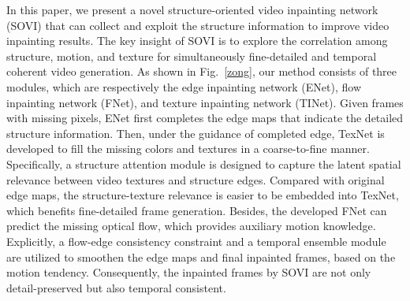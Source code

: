 In this paper, we present a novel structure-oriented video inpainting network (SOVI) that can collect and exploit the structure information to improve video inpainting results. %
The key insight of SOVI is to explore the correlation among structure, motion, and texture for simultaneously fine-detailed and temporal coherent video generation. %
As shown in Fig.~\ref{zong}, our method consists of three modules, which are respectively the edge inpainting network (ENet), flow inpainting network (FNet), and texture inpainting network (TINet).
Given frames with missing pixels, ENet first completes the edge maps that indicate the detailed structure information. Then, under the guidance of completed edge, TexNet is developed to fill the missing colors and textures in a coarse-to-fine manner.
Specifically, a structure attention module is designed to capture the latent spatial relevance between video textures and structure edges.
Compared with original edge maps, the structure-texture relevance is easier to be embedded into TexNet, which benefits fine-detailed frame generation.
Besides, the developed FNet can predict the missing optical flow, which provides auxiliary motion knowledge. Explicitly, a flow-edge consistency constraint and a temporal ensemble module are utilized to smoothen the edge maps and final inpainted frames, based on the motion tendency. Consequently, the inpainted frames by SOVI are not only detail-preserved but also temporal consistent.


